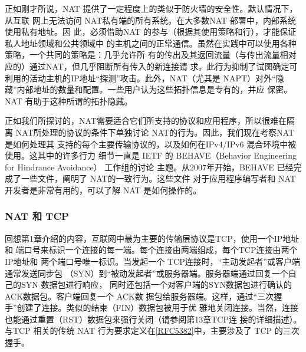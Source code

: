 正如刚才所说，NAT 提供了一定程度上的类似于防火墙的安全性。默认情况下，从互联
网上无法访问 NAT私有端的所有系统。在大多数NAT 部署中，内部系统使用私有地址。因
此，必须借助NAT 的参与（根据其使用策略和行），才能保证私人地址领域和公共领域中
的主机之间的正常通信。虽然在实践中可以使用各种策略，一个共同的策略是：几乎允许所
有的传出及其返回流量（与传出流量相对应的）通过NAT，但几乎阻断所有传入的新连接请
求。此行为抑制了试图确定可利用的活动主机的IP地址“探测”攻击。此外，NAT（尤其是
NAPT）对外“隐藏”内部地址的数量和配置。一些用户认为这些拓扑信息是专有的，并应
保密。NAT 有助于这种所谓的拓扑隐藏。

正如我们所探讨的，NAT需要适合它们所支持的协议和应用程序，所以很难在隔离
NAT所处理的协议的条件下单独讨论 NAT的行为。因此，我们现在考察NAT是如何处理其
支持的每个主要传输协议的，以及如何在IPv4/IPv6 混合环境中被使用。这其中的许多行力
细节一直是 IETF 的 BEHAVE（Behavior Engineering for Hindrance Avoidance） 工作组的讨论
主题。从2007年开始，BEHAVE 已经完成了一些文件，阐明了 NAT的一致行为。这些文件
对于应用程序编写者和 NAT 开发者是非常有用的，可以了解 NAT 是如何操作的。

\subsubsection{NAT 和 TCP}

回想第1章介绍的内容，互联网中最为主要的传输层协议是TCP，使用一个IP地址和
端口号来标识一个连接的每一端。每个连接由两端组成，每个TCP连接由两个IP地址和
两个端口号唯一标识。当发起一个 TCP连接时，“主动发起者”或客户端通常发送同步包
（SYN）到“被动发起者”或服务器端。服务器端通过回复一个自己的SYN 数据包进行响应，
同时还包括一个对客户端的SYN数据包进行确认的ACK数据包。客户端回复一个 ACK数
据包给服务器端。这样，通过“三次握手”创建了连接。类似的结束（FIN）数据包被用于优
雅地关闭连接。当然，连接也能通过重置（RST）数据包来强行关闭（请参阅第13章TCP连
接的详细描述）。与TCP 相关的传统 NAT 行为要求定义在\href{https://www.rfc-editor.org/rfc/rfc5382}{[RFC5382]}中，主要涉及了 TCP
的三次握手。

